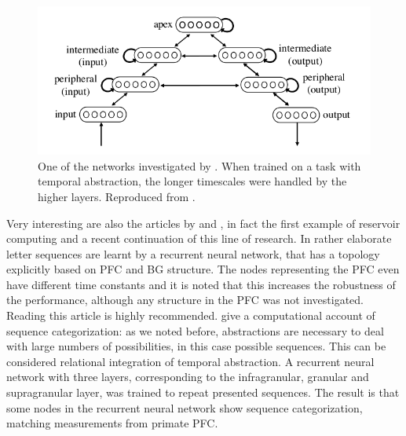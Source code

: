 \documentclass[10pt,a4paper]{report}
\begin{document}
\begin{figure}[tbhp]
\begin{center}
\includegraphics[scale = 0.37]{figures/botvinick.png}
\caption{One of the networks investigated by \citet{Botvinick2007}. When trained on a task with temporal abstraction, the longer timescales were handled by the higher layers. Reproduced from \citet{Botvinick2007}.}
\label{botvinick}
\end{center}
\end{figure}

Very interesting are also the articles by \citet{Dominey1995} and \citet{Hinaut2011}, in fact the first example of reservoir computing and a recent continuation of this line of research. In \citet{Dominey1995} rather elaborate letter sequences are learnt by a recurrent neural network, that has a topology explicitly based on PFC and BG structure. The nodes representing the PFC even have different time constants and it is noted that this increases the robustness of the performance, although any structure in the PFC was not investigated. Reading this article is highly recommended. \citet{Hinaut2011} give a computational account of sequence categorization: as we noted before, abstractions are necessary to deal with large numbers of possibilities, in this case possible sequences. This can be considered relational integration of temporal abstraction. A recurrent neural network with three layers, corresponding to the infragranular, granular and supragranular layer, was trained to repeat presented sequences. The result is that some nodes in the recurrent neural network show sequence categorization, matching measurements from primate PFC.
\end{document}

